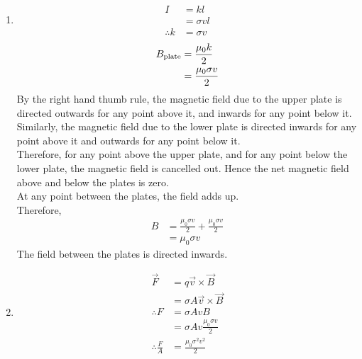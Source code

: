 \documentclass[fleqn, a4paper, 11pt, oneside]{amsart}
\theoremstyle{definition}
\theoremstyle{theorem}
\begin{document}
\begin{solution}
	\begin{enumerate}[leftmargin = *]
		\item
			\begin{align*}
				I            & = k l        \\
                                             & = \sigma v l \\
				\therefore k & = \sigma v
			\end{align*}
			\begin{align*}
				B_{\textnormal{plate}} & = \frac{\mu_0 k}{2} \\
                                                       & = \frac{\mu_0 \sigma v}{2}
			\end{align*}
			By the right hand thumb rule, the magnetic field due to the upper plate is directed outwards for any point above it, and inwards for any point below it.\\
			Similarly, the magnetic field due to the lower plate is directed inwards for any point above it and outwards for any point below it.\\
			Therefore, for any point above the upper plate, and for any point below the lower plate, the magnetic field is cancelled out.
			Hence the net magnetic field above and below the plates is zero.\\
			At any point between the plates, the field adds up.\\
			Therefore,
			\begin{align*}
				B & = \frac{\mu_0 \sigma v}{2} + \frac{\mu_0 \sigma v}{2} \\
                                  & = \mu_0 \sigma v
			\end{align*}
			The field between the plates is directed inwards.
		\item
			\begin{align*}
				\overrightarrow{F}     & = q \overrightarrow{v} \times \overrightarrow{B}        \\
                                                       & = \sigma A \overrightarrow{v} \times \overrightarrow{B} \\
				\therefore F           & = \sigma A v B                                          \\
                                                       & = \sigma A v \frac{\mu_0 \sigma v}{2}                   \\
				\therefore \frac{F}{A} & = \frac{\mu_0 \sigma^2 v^2}{2}
			\end{align*}

\end{enumerate}
\end{solution}
\end{document}
